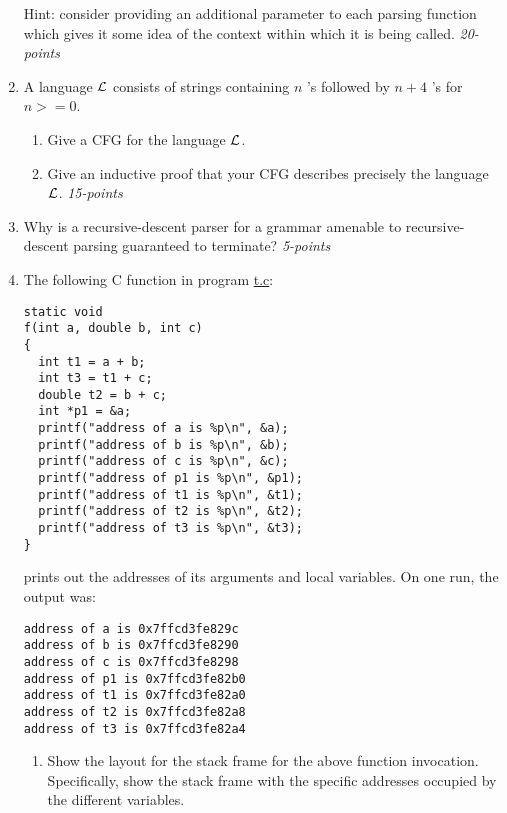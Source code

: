 \documentclass[12pt]{article}
\begin{document}
\begin{enumerate}
  Hint: consider providing an additional parameter to each parsing
  function which gives it some idea of the context within which it is
  being called.  \hfill\textit{20-points}

\item A language $\cal L$ consists of strings containing $n$
  \verb@a@'s followed by $n + 4$ \verb@b@'s for $n >= 0$.

\begin{enumerate}
\item Give a CFG for the language $\cal L$.

\item Give an inductive proof that your CFG describes precisely the
  language $\cal L$. \hfill\textit{15-points}

\end{enumerate}

\item Why is a recursive-descent parser for a grammar amenable to
  recursive-descent parsing guaranteed to terminate? \hfill\textit{5-points}

\item The following C function in program \href{./t.c}{t.c}:

\begin{verbatim}
static void
f(int a, double b, int c)
{
  int t1 = a + b;
  int t3 = t1 + c;
  double t2 = b + c;
  int *p1 = &a;
  printf("address of a is %p\n", &a);
  printf("address of b is %p\n", &b);
  printf("address of c is %p\n", &c);
  printf("address of p1 is %p\n", &p1);
  printf("address of t1 is %p\n", &t1);
  printf("address of t2 is %p\n", &t2);
  printf("address of t3 is %p\n", &t3);
}  
\end{verbatim}

prints out the addresses of its arguments and local variables.  On one run,
the output was:

\begin{verbatim}
address of a is 0x7ffcd3fe829c
address of b is 0x7ffcd3fe8290
address of c is 0x7ffcd3fe8298
address of p1 is 0x7ffcd3fe82b0
address of t1 is 0x7ffcd3fe82a0
address of t2 is 0x7ffcd3fe82a8
address of t3 is 0x7ffcd3fe82a4
\end{verbatim}

\begin{enumerate}
\item Show the layout for the stack frame for the above function
  invocation.  Specifically, show the stack frame with the specific
  addresses occupied by the different variables.


\end{enumerate}
\end{enumerate}
\end{document}

